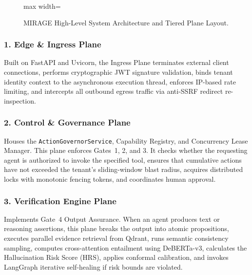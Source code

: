 \documentclass[11pt,a4paper]{article}
\begin{document}
\begin{figure}[!htbp]
\begin{adjustbox}{max width=\linewidth}
\end{adjustbox}
\caption{MIRAGE High-Level System Architecture and Tiered Plane Layout.}
\label{fig:hld_overview}
\end{figure}

\subsubsection{1. Edge \& Ingress Plane}
Built on FastAPI and Uvicorn, the Ingress Plane terminates external client connections, performs cryptographic JWT signature validation, binds tenant identity context to the asynchronous execution thread, enforces IP-based rate limiting, and intercepts all outbound egress traffic via anti-SSRF redirect re-inspection.

\subsubsection{2. Control \& Governance Plane}
Houses the \texttt{ActionGovernorService}, Capability Registry, and Concurrency Lease Manager. This plane enforces Gates~1, 2, and 3. It checks whether the requesting agent is authorized to invoke the specified tool, ensures that cumulative actions have not exceeded the tenant's sliding-window blast radius, acquires distributed locks with monotonic fencing tokens, and coordinates human approval.

\subsubsection{3. Verification Engine Plane}
Implements Gate~4 Output Assurance. When an agent produces text or reasoning assertions, this plane breaks the output into atomic propositions, executes parallel evidence retrieval from Qdrant, runs semantic consistency sampling, computes cross-attention entailment using DeBERTa-v3, calculates the Hallucination Risk Score (HRS), applies conformal calibration, and invokes LangGraph iterative self-healing if risk bounds are violated.
\end{document}
